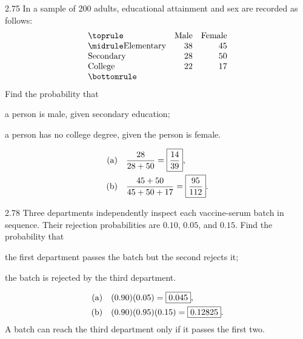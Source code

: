 \documentclass[11pt,oneside]{article}
\begin{document}
\begin{exercise}{2.75}
In a sample of 200 adults, educational attainment and sex are recorded as follows:
\[
\begin{array}{lrr}\toprule
&\text{Male}&\text{Female}\\\midrule
\text{Elementary}&38&45\\\text{Secondary}&28&50\\\text{College}&22&17\\\bottomrule
\end{array}
\]
Find the probability that
\par
\begin{exercisesubparts}
\item a person is male, given secondary education;
\item a person has no college degree, given the person is female.
\end{exercisesubparts}
\end{exercise}

\begin{solution}
\begin{align*}
\textup{(a)}\quad&\frac{28}{28+50}=\boxed{\frac{14}{39}},\\
\textup{(b)}\quad&\frac{45+50}{45+50+17}=\boxed{\frac{95}{112}}.
\end{align*}
\end{solution}

\begin{exercise}{2.78}
Three departments independently inspect each vaccine-serum batch in sequence. Their rejection probabilities are $0.10$, $0.05$, and $0.15$. Find the probability that
\par
\begin{exercisesubparts}
\item the first department passes the batch but the second rejects it;
\item the batch is rejected by the third department.
\end{exercisesubparts}
\end{exercise}

\begin{solution}
\begin{align*}
\textup{(a)}\quad&(0.90)(0.05)=\boxed{0.045},\\
\textup{(b)}\quad&(0.90)(0.95)(0.15)=\boxed{0.12825}.
\end{align*}
A batch can reach the third department only if it passes the first two.
\end{solution}
\end{document}

